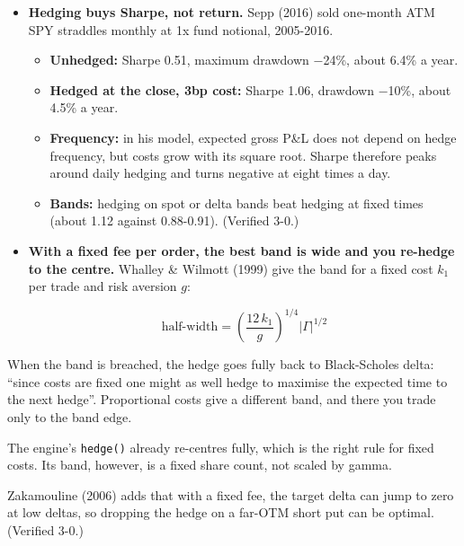 \documentclass{article}
\begin{document}
\begin{itemize}

\item \textbf{Hedging buys Sharpe, not return.} Sepp (2016) sold one-month ATM SPY straddles monthly at 1x fund notional, 2005-2016.

\begin{itemize}

\item \textbf{Unhedged:} Sharpe 0.51, maximum drawdown \ensuremath{-}24\%, about 6.4\% a year.

\item \textbf{Hedged at the close, 3bp cost:} Sharpe 1.06, drawdown \ensuremath{-}10\%, about 4.5\% a year.

\item \textbf{Frequency:} in his model, expected gross P\&L does not depend on hedge frequency, but costs grow with its square root. Sharpe therefore peaks around daily hedging and turns negative at eight times a day.

\item \textbf{Bands:} hedging on spot or delta bands beat hedging at fixed times (about 1.12 against 0.88-0.91). (Verified 3-0.)

\end{itemize}

\item \textbf{With a fixed fee per order, the best band is wide and you re-hedge to the centre.} Whalley \& Wilmott (1999) give the band for a fixed cost $k_1$ per trade and risk aversion $g$:

\[\text{half-width} = \left(\frac{12\,k_1}{g}\right)^{1/4} |\Gamma|^{1/2}\]

\end{itemize}

When the band is breached, the hedge goes fully back to Black-Scholes delta: ``since costs are fixed one might as well hedge to maximise the expected time to the next hedge''. Proportional costs give a different band, and there you trade only to the band edge.

The engine's \texttt{hedge()} already re-centres fully, which is the right rule for fixed costs. Its band, however, is a fixed share count, not scaled by gamma.

Zakamouline (2006) adds that with a fixed fee, the target delta can jump to zero at low deltas, so dropping the hedge on a far-OTM short put can be optimal. (Verified 3-0.)
\end{document}
